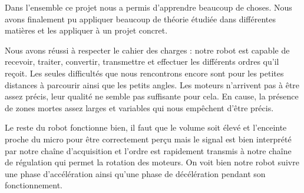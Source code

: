 Dans l’ensemble ce projet nous a permis d’apprendre beaucoup de choses. Nous avons finalement pu appliquer beaucoup de théorie étudiée dans différentes matières et les appliquer à un projet concret. 

Nous avons réussi à respecter le cahier des charges : notre robot est capable de recevoir, traiter, convertir, transmettre et effectuer les différents ordres qu’il reçoit. Les seules difficultés que nous rencontrons encore sont pour les petites distances à parcourir ainsi que les petits angles. Les moteurs n’arrivent pas à être assez précis, leur qualité ne semble pas suffisante pour cela. En cause, la présence de zones mortes assez larges et variables qui nous empêchent d’être précis. 

Le reste du robot fonctionne bien, il faut que le volume soit élevé et l’enceinte proche du micro pour être correctement perçu mais le signal est bien interprété par notre chaîne d’acquisition et l’ordre est rapidement transmis à notre chaîne de régulation qui permet la rotation des moteurs. On voit bien notre robot suivre une phase d’accélération ainsi qu’une phase de décélération pendant son fonctionnement. 
